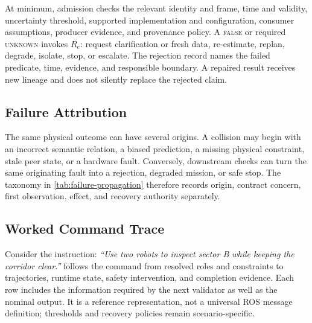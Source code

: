 At minimum, admission checks the relevant identity and frame, time and validity,
uncertainty threshold, supported implementation and configuration, consumer
assumptions, producer evidence, and provenance policy.  A \textsc{false} or
required \textsc{unknown} invokes $R_e$: request clarification or fresh data,
re-estimate, replan, degrade, isolate, stop, or escalate.  The rejection record
names the failed predicate, time, evidence, and responsible boundary.  A repaired
result receives new lineage and does not silently replace the rejected claim.

\subsection{Failure Attribution}

The same physical outcome can have several origins.  A collision may begin with
an incorrect semantic relation, a biased prediction, a missing physical
constraint, stale peer state, or a hardware fault.  Conversely, downstream
checks can turn the same originating fault into a rejection, degraded mission,
or safe stop.  The taxonomy in \cref{tab:failure-propagation} therefore records
origin, contract concern, first observation, effect, and recovery authority
separately.

\FloatBarrier


\subsection{Worked Command Trace}

Consider the instruction: \emph{``Use two robots to inspect sector B while
keeping the corridor clear.''}   follows the command
from resolved roles and constraints to trajectories, runtime state, safety
intervention, and completion evidence.  Each row includes the information
required by the next validator as well as the nominal output.  It is a reference
representation, not a universal ROS message definition; thresholds and recovery
policies remain scenario-specific.

\FloatBarrier

